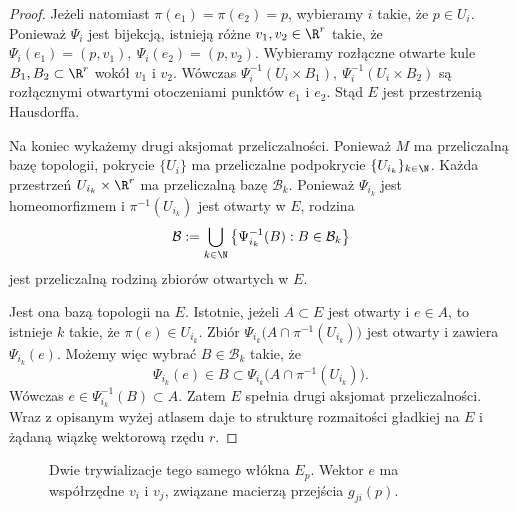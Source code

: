 \begin{proof}
Jeżeli natomiast $\pi(e_1)=\pi(e_2)=p$,
wybieramy $i$ takie, że $p\in U_i$.
Ponieważ $\Psi_i$ jest bijekcją, istnieją różne
$v_1,v_2\in\R^r$ takie, że $\Psi_i(e_1)=(p,v_1), \ \Psi_i(e_2)=(p,v_2)$.
Wybieramy rozłączne otwarte kule
$B_1,B_2\subset\R^r$ wokół $v_1$ i $v_2$.
Wówczas $\Psi_i^{-1}(U_i\times B_1), \ \Psi_i^{-1}(U_i\times B_2)$
są rozłącznymi otwartymi otoczeniami
punktów $e_1$ i $e_2$.
Stąd $E$ jest przestrzenią Hausdorffa.

Na koniec wykażemy drugi aksjomat przeliczalności.
Ponieważ $M$ ma przeliczalną bazę topologii,
pokrycie $\{U_i\}$ ma przeliczalne podpokrycie
$\{U_{i_k}\}_{k\in\N}$.
Każda przestrzeń $U_{i_k}\times\R^r$ ma
przeliczalną bazę $\mathcal B_k$.
Ponieważ $\Psi_{i_k}$ jest homeomorfizmem
i $\pi^{-1}(U_{i_k})$ jest otwarty w $E$,
rodzina
\[
\mathcal B:=
\bigcup_{k\in\N}
\left\{
\Psi_{i_k}^{-1}(B):B\in\mathcal B_k
\right\}
\]
jest przeliczalną rodziną zbiorów otwartych w $E$.

Jest ona bazą topologii na $E$. Istotnie, jeżeli
$A\subset E$ jest otwarty i $e\in A$, to istnieje
$k$ takie, że $\pi(e)\in U_{i_k}$.
Zbiór $\Psi_{i_k}\bigl( A\cap\pi^{-1}(U_{i_k}) \bigr)$
jest otwarty i zawiera $\Psi_{i_k}(e)$.
Możemy więc wybrać $B\in\mathcal B_k$ takie, że
\[
\Psi_{i_k}(e)\in B
\subset
\Psi_{i_k}\bigl(
A\cap\pi^{-1}(U_{i_k})
\bigr).
\]
Wówczas $e\in\Psi_{i_k}^{-1}(B)\subset A$.
Zatem $E$ spełnia drugi aksjomat przeliczalności.
Wraz z opisanym wyżej atlasem daje to strukturę
rozmaitości gładkiej na $E$ i żądaną wiązkę wektorową
rzędu $r$.
\end{proof}


\begin{figure}[ht]
\centering
{}
\caption{Dwie trywializacje tego samego włókna $E_p$. Wektor $e$ ma współrzędne $v_i$ i $v_j$, związane macierzą przejścia $g_{ji}(p)$.}
\end{figure}

